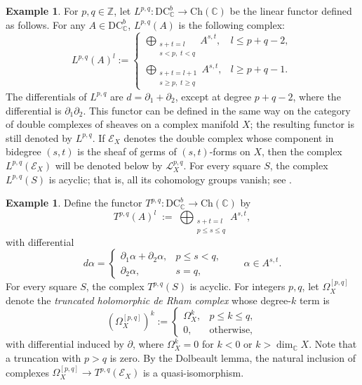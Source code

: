 \documentclass[11pt]{amsart}
\numberwithin{equation}{section}
\theoremstyle{plain}
\theoremstyle{definition}
\newtheorem{Ex}[thm]{Example}
\begin{document}
\begin{Ex}\label{ex-Lpq-functor}\normalfont
For $p,q\in\mathbb Z$, let $L^{p,q}:\mathrm{DC}_{\mathbb C}^b\longrightarrow\mathrm{Ch}(\mathbb C)$
be the linear functor defined as follows.
For any $A\in \mathrm{DC}_{\mathbb{C}}^{b}$,   $L^{p,q}(A)$ is the following complex:
\[
L^{p,q}(A)^l:=
\begin{cases}
\displaystyle \bigoplus_{\substack{s+t=l \\ s<p,\; t<q}} A^{s,t}, & l \le p+q-2, \\[1.2em]
\displaystyle \bigoplus_{\substack{s+t=l+1 \\ s\ge p,\; t\ge q}} A^{s,t}, & l \ge p+q-1.
\end{cases}
\]
The differentials of $L^{p,q}$ are $d=\partial_1+\partial_2$, except at
degree $p+q-2$, where the differential is $\partial_1\partial_2$.
This functor can be defined in the same way on the category of double
complexes of sheaves on a complex manifold $X$; the resulting functor is
still denoted by $L^{p,q}$.
If $\mathcal E_X$ denotes the double complex whose component in bidegree
$(s,t)$ is the sheaf of germs of $(s,t)$-forms on $X$, then the complex
$L^{p,q}(\mathcal E_X)$ will be denoted below by $\mathcal L_X^{p,q}$.
For every square $S$, the complex $L^{p,q}(S)$ is acyclic; that is, all its
cohomology groups vanish; see \cite[Lemma 2.3]{Se25}.
\end{Ex}
\begin{Ex}\label{ex-Tpq-functor}\normalfont
Define the functor
$T^{p,q}:\mathrm{DC}_{\mathbb C}^b\longrightarrow\mathrm{Ch}(\mathbb C)$ by
\[
T^{p,q}(A)^l \;:=\; \bigoplus_{\substack{s+t=l\\ p\le s\le q}} A^{s,t},
\]
with differential 
 \[
d\alpha=
\begin{cases}
\partial_1 \alpha+\partial_2 \alpha, & p\le s<q,\\[2mm]
\partial_2 \alpha, & s=q,
\end{cases}
\qquad \alpha\in A^{s,t}.
\]
For every square $S$, the complex $T^{p,q}(S)$ is acyclic.
For integers $p,q$, let $\Omega_X^{[p,q]}$ denote the \emph{truncated holomorphic
de Rham complex} whose degree-$k$ term is
\[
(\Omega_X^{[p,q]})^k:=
\begin{cases}
\Omega_X^k, & p\le k\le q,\\
0, & \text{otherwise},
\end{cases}
\]
with differential induced by $\partial$, where $\Omega_X^k=0$ for
$k<0$ or $k>\dim_{\mathbb C}X$.
Note that a truncation with $p>q$ is zero. By the Dolbeault lemma, the natural
inclusion of complexes $\Omega_X^{[p,q]}\longrightarrow T^{p,q}(\mathcal E_X)$ is a
quasi-isomorphism.
\end{Ex}
\end{document}
